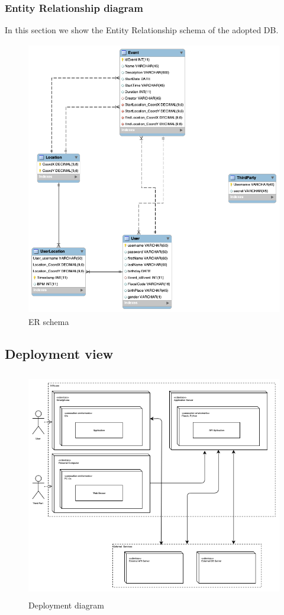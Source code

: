 \documentclass[DD.tex]{subfiles}
\begin{document}
\newpage
\subsubsection{Entity Relationship diagram}
In this section we show the Entity Relationship schema of the adopted DB.
\begin{figure}[h!]
	\centering
	\includegraphics[height=12.00cm,keepaspectratio]{Figures/er-schema}
	\caption{ER schema}
\end{figure}


\newpage
\subsection{Deployment view}

\begin{figure}[h!]
	\centering
	\includegraphics[height=10.00cm,keepaspectratio]{Figures/DeploymentDiagram}
	\caption{Deployment diagram}
\end{figure}
\end{document}

